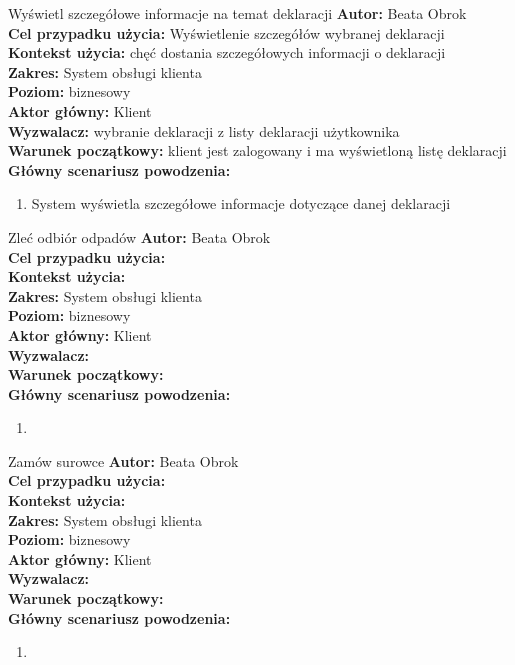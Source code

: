 	\begin{usecase}{Wyświetl szczegółowe informacje na temat deklaracji}
		\textbf{Autor:} Beata Obrok \\
		\textbf{Cel przypadku użycia:} Wyświetlenie szczegółów wybranej deklaracji \\
		\textbf{Kontekst użycia:} chęć dostania szczegółowych informacji o deklaracji\\
		\textbf{Zakres:} System obsługi klienta \\
		\textbf{Poziom:} biznesowy \\
		\textbf{Aktor główny:} Klient\\
		\textbf{Wyzwalacz:} wybranie deklaracji z listy deklaracji użytkownika \\
		\textbf{Warunek początkowy:} klient jest zalogowany i ma wyświetloną listę deklaracji\\
		\textbf{Główny scenariusz powodzenia:} \\
			\begin{enumerate}
				\item System wyświetla szczegółowe informacje dotyczące danej deklaracji
			\end{enumerate}
	\end{usecase}

	\begin{usecase}{Zleć odbiór odpadów}
		\textbf{Autor:} Beata Obrok \\
		\textbf{Cel przypadku użycia:} \\
		\textbf{Kontekst użycia:} \\
		\textbf{Zakres:} System obsługi klienta \\
		\textbf{Poziom:} biznesowy \\
		\textbf{Aktor główny:} Klient\\
		\textbf{Wyzwalacz:} \\
		\textbf{Warunek początkowy:} \\
		\textbf{Główny scenariusz powodzenia:} \\
			\begin{enumerate}
				\item
			\end{enumerate}
	\end{usecase}

	\begin{usecase}{Zamów surowce}
		\textbf{Autor:} Beata Obrok \\
		\textbf{Cel przypadku użycia:} \\
		\textbf{Kontekst użycia:} \\
		\textbf{Zakres:} System obsługi klienta \\
		\textbf{Poziom:} biznesowy \\
		\textbf{Aktor główny:} Klient\\
		\textbf{Wyzwalacz:} \\
		\textbf{Warunek początkowy:} \\
		\textbf{Główny scenariusz powodzenia:} \\
			\begin{enumerate}
				\item
			\end{enumerate}
	\end{usecase}

